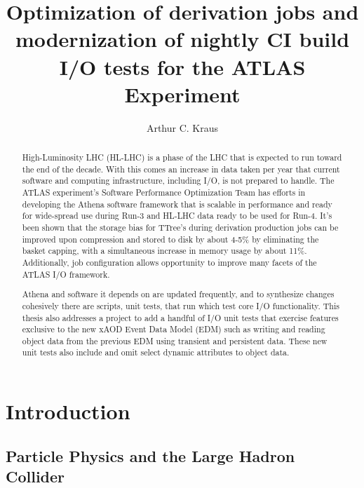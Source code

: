 \documentclass[12pt]{niuthesis}
\title{Optimization of derivation jobs and modernization of nightly CI build I/O tests for the ATLAS Experiment}
\author{Arthur C. Kraus}
\begin{document}
\begin{abstract}
High-Luminosity LHC (HL-LHC) is a phase of the LHC that is expected to run toward the end of the decade. With this comes an increase in data taken per year that current software and computing infrastructure, including I/O, is not prepared to handle. 
The ATLAS experiment's Software Performance Optimization Team has efforts in developing the Athena software framework that is scalable in performance and ready for wide-spread use during Run-3 and HL-LHC data ready to be used for Run-4. 
It's been shown that the storage bias for TTree's during derivation production jobs can be improved upon compression and stored to disk by about 4-5\% by eliminating the basket capping, with a simultaneous increase in memory usage by about 11\%. 
Additionally, job configuration allows opportunity to improve many facets of the ATLAS I/O framework.

Athena and software it depends on are updated frequently, and to synthesize changes cohesively there are scripts, unit tests, that run which test core I/O functionality. 
This thesis also addresses a project to add a handful of I/O unit tests that exercise features exclusive to the new xAOD Event Data Model (EDM) such as writing and reading object data from the previous EDM using transient and persistent data. 
These new unit tests also include and omit select dynamic attributes to object data. 
\end{abstract}

\begin{dedication}

\end{dedication}

\begin{acknowledgements}

\end{acknowledgements}
\MakeThesisPrologue




\chapter{Introduction}
\label{chap:Intro}
\section{Particle Physics and the Large Hadron Collider}

\end{document}
